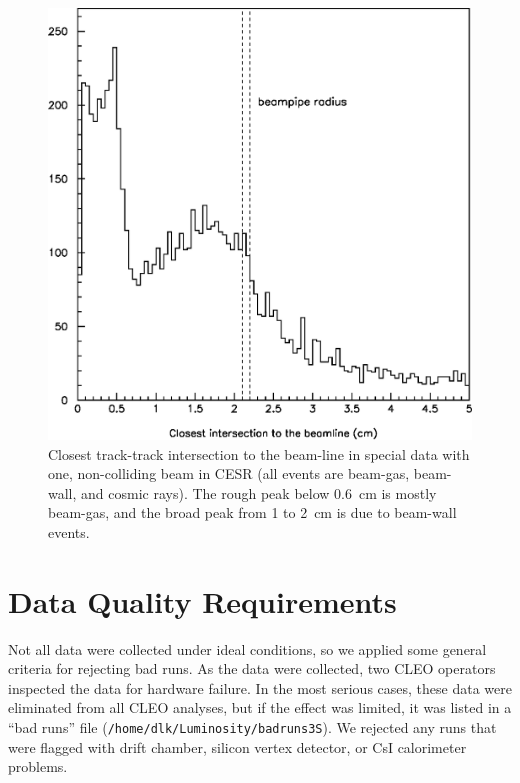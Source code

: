 \documentclass{cornell}
\begin{document}
\begin{figure}[p]
  \begin{center}
    \includegraphics[width=\linewidth]{smallbeamwall}
  \end{center}
  \caption[Relative magnitudes of beam-gas, beam-wall, and cosmic
  rays]{\label{smallbeamwall} Closest track-track intersection to the
  beam-line in special data with one, non-colliding beam in CESR (all
  events are beam-gas, beam-wall, and cosmic rays).  The rough peak
  below 0.6~cm is mostly beam-gas, and the broad peak from 1 to 2~cm
  is due to beam-wall events.}
\end{figure}

\section{Data Quality Requirements}
\label{sec:quality}

Not all data were collected under ideal conditions, so we applied some
general criteria for rejecting bad runs.  As the data were collected,
two CLEO operators inspected the data for hardware failure.  In the
most serious cases, these data were eliminated from all CLEO analyses,
but if the effect was limited, it was listed in a ``bad runs'' file
({\tt /home/dlk/Luminosity/badruns3S}).  We rejected any runs that
were flagged with drift chamber, silicon vertex detector, or CsI
calorimeter problems.
\end{document}
